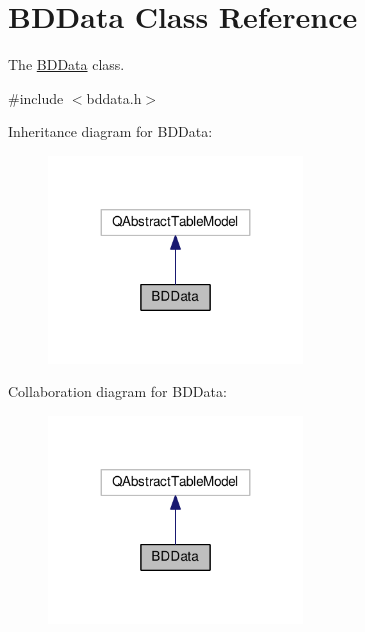 \hypertarget{classBDData}{}\section{B\+D\+Data Class Reference}
\label{classBDData}


The \hyperlink{classBDData}{B\+D\+Data} class.  




{\ttfamily \#include $<$bddata.\+h$>$}



Inheritance diagram for B\+D\+Data\+:\nopagebreak
\begin{figure}[H]
\begin{center}
\leavevmode
\includegraphics[width=191pt]{classBDData__inherit__graph}
\end{center}
\end{figure}


Collaboration diagram for B\+D\+Data\+:\nopagebreak
\begin{figure}[H]
\begin{center}
\leavevmode
\includegraphics[width=191pt]{classBDData__coll__graph}
\end{center}
\end{figure}
